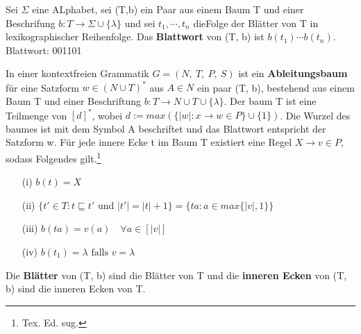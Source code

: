     Sei \(\Sigma\) eine ALphabet, sei (T,b) ein Paar aus einem Baum T und einer Beschrifung \(b: T \to \Sigma \cup \{\lambda\}\) und sei \(t_1, \cdots, t_n\) dieFolge der Blätter von T in lexikographischer Reihenfolge. Das \textbf{Blattwort} von (T, b) ist \(b(t_1) \cdots b(t_n)\). Blattwort: 001101
    {
    }
\newpage
{} 
    In einer kontextfreien Grammatik \(G = (N,\ T,\ P,\ S)\) ist ein \textbf{Ableitungsbaum} für eine Satzform \(w \in (N \cup T)^*\) aus \(A \in N\) ein paar (T, b), bestehend aus einem Baum T und einer Beschriftung \(b: T \to N \cup T \cup \{\lambda\}\). Der baum T ist eine Teilmenge von \([d]^*\), wobei \(d:= max (\{|w|: x \to w \in P\} \cup \{1\})\). Die Wurzel des baumes ist mit dem Symbol A beschriftet und das Blattwort entspricht der Satzform w. Für jede innere Ecke t im Baum T existiert eine Regel \(X \to v \in P\), sodass Folgendes gilt.\footnote{Tex. Ed. sug.}
    \begin{itemize}
        \item [(i)] \(b(t) = X\)
        \item [(ii)] \(\{t' \in T : t \sqsubseteq t' \text{ und } |t'| = |t| + 1\} = \{ta : a \in max \{|v|, 1\}\}\)
        \item [(iii)] \(b(ta) = v(a) \quad \forall a \in [|v|]\)
        \item [(iv)] \(b(t_1) = \lambda \text{ falls } v = \lambda\)
    \end{itemize}
    Die \textbf{Blätter} von (T, b) sind die Blätter von T und die \textbf{inneren Ecken} von (T, b) sind die inneren Ecken von T.

